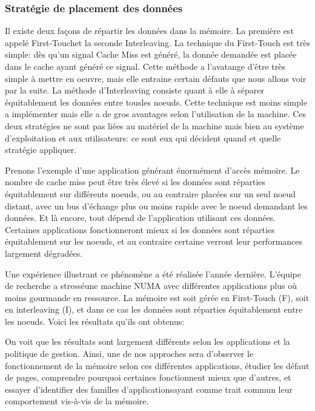       \subsubsection{Stratégie de placement des données}
      
        Il existe deux façons de répartir les données dans la mémoire. La
        première est appelé \og First-Touch\fg et la seconde \og
        Interleaving\fg. La technique du First-Touch est très simple: dès qu'un
        signal Cache Miss est généré, la donnée demandée est placée dans le
        cache ayant généré ce signal. Cette méthode a l'avatange d'être très
        simple à mettre en oeuvre, mais elle entraine certain défauts que nous
        allons voir par la suite. La méthode d'Interleaving consiste quant à
        elle à séparer équitablement les données entre \og tous\fg les
        noeuds. Cette technique est moins simple a implémenter mais elle a de
        gros avantages selon l'utilisation de la machine. Ces deux stratégies ne
        sont pas liées au matériel de la machine mais bien au système
        d'exploitation et aux utilisateurs: ce sont eux qui décident quand et
        quelle stratégie appliquer.\newline

        Prenons l'exemple d'une application générant énormément d'accès
        mémoire. Le nombre de cache miss peut être très élevé si les données
        sont réparties équitablement sur différents noeuds, ou au contraire
        placées sur un seul noeud distant, avec un bus d'échange plus ou moins
        rapide avec le noeud demandant les données. Et là encore, tout dépend de
        l'application utilisant ces données. Certaines applications
        fonctionneront mieux si les données sont réparties équitablement sur les
        noeuds, et au contraire certaine verront leur performances largement
        dégradées.\newline

        Une expérience illustrant ce phénomène a été réalisée l'année
        dernière\cite{Holistic2013}. L'équipe de recherche a \og stressé\fg une
        machine NUMA avec différentes applications plus où moins gourmande en
        ressource. La mémoire est soit gérée en \og First-Touch (F)\fg, soit en
        \og interleaving (I)\fg, et dans ce cas les données sont réparties
        équitablement entre les noeuds. Voici les résultats qu'ils ont obtenus:

      
        On voit que les résultats sont largement différents selon les
        applications et la politique de gestion. Ainsi, une de nos approches
        sera d'observer le fonctionnement de la mémoire selon ces différentes
        applications, étudier les défaut de pages, comprendre pourquoi certaines
        fonctionnent mieux que d'autres, et essayer d'identifier des \og
        familles d'applications\fg ayant comme trait commun leur comportement
        vis-à-vis de la mémoire.    
    


  
